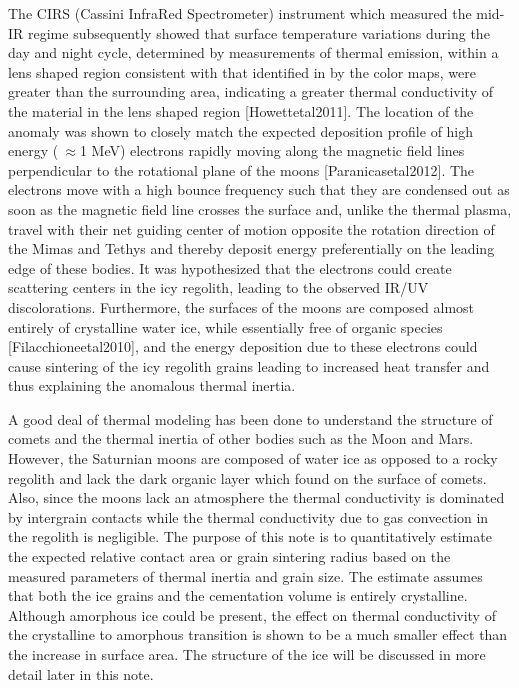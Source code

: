 \documentclass[11pt]{article} %
\begin{document}
	The CIRS (Cassini InfraRed Spectrometer) instrument which measured the mid-IR regime subsequently showed that surface temperature variations during the day and night cycle, determined by measurements of thermal emission, within a lens shaped region consistent with that identified in by the color maps, were greater than the surrounding area, indicating a greater thermal conductivity of the material in the lens shaped region [Howettetal2011]. The location of the anomaly was shown to closely match the expected deposition profile of high energy ($\>\approx$1 MeV) electrons rapidly moving along the magnetic field lines perpendicular to the rotational plane of the moons [Paranicasetal2012]. The electrons move with a high bounce frequency such that they are condensed out as soon as the magnetic field line crosses the surface and, unlike the thermal plasma, travel with their net guiding center of motion opposite the rotation direction of the Mimas and Tethys and thereby deposit energy preferentially on the leading edge of these bodies. It was hypothesized that the electrons could create scattering centers in the icy regolith, leading to the observed IR/UV discolorations. Furthermore, the surfaces of the moons are composed almost entirely of crystalline water ice, while essentially free of organic species [Filacchioneetal2010], and the energy deposition due to these electrons could cause sintering of the icy regolith grains leading to increased heat transfer and thus explaining the anomalous thermal inertia.

	A good deal of thermal modeling has been done to understand the structure of comets and the thermal inertia of other bodies such as the Moon and Mars. However, the Saturnian moons are composed of water ice as opposed to a rocky regolith and lack the dark organic layer which found on the surface of comets. Also, since the moons lack an atmosphere the thermal conductivity is dominated by intergrain contacts while the thermal conductivity due to gas convection in the regolith is negligible. The purpose of this note is to quantitatively estimate the expected relative contact area or grain sintering radius based on the measured parameters of thermal inertia and grain size. The estimate assumes that both the ice grains and the cementation volume is entirely crystalline. Although amorphous ice could be present, the effect on thermal conductivity of the crystalline to amorphous transition is shown to be a much smaller effect than the increase in surface area. The structure of the ice will be discussed in more detail later in this note. 
	
\end{document}
